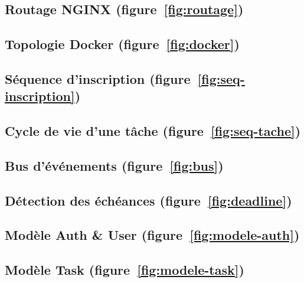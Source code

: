 \documentclass[11pt,a4paper,oneside]{report}
\begin{document}
\subsection{Routage NGINX (figure~\ref{fig:routage})}


\subsection{Topologie Docker (figure~\ref{fig:docker})}


\subsection{Séquence d'inscription (figure~\ref{fig:seq-inscription})}


\subsection{Cycle de vie d'une tâche (figure~\ref{fig:seq-tache})}


\subsection{Bus d'événements (figure~\ref{fig:bus})}


\subsection{Détection des échéances (figure~\ref{fig:deadline})}


\subsection{Modèle Auth \& User (figure~\ref{fig:modele-auth})}


\subsection{Modèle Task (figure~\ref{fig:modele-task})}

\end{document}
